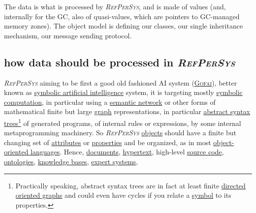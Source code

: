 \documentclass[11pt,a4paper,svgnames]{article}
\newcommand{\RefPerSys}{{\textit{\textsc{RefPerSys}}}}
\begin{document}
The data is what is processed by {\RefPerSys}, and is made of values
(and, internally for the GC, also of quasi-values, which are pointers
to GC-managed memory zones). The object model is defining our classes,
our single inheritance mechanism, our message sending protocol.

\subsection{how data should be processed in \RefPerSys}
\label{subsec:howdata}

{\RefPerSys} aiming to be first a good old fashioned AI system
(\href{http://bootstrappingartificialintelligence.fr/WordPress3/2013/12/the-future-of-ai-is-the-good-old-fashioned-artificial-intelligence/}{\textsc{Gofai}}),
better known as
\href{https://en.wikipedia.org/wiki/Symbolic\_artificial\_intelligence}{symbolic
  artificial intelligence} system, it is targeting mostly
\href{https://en.wikipedia.org/wiki/Computer\_algebra}{symbolic
  computation}, in particular using a
\href{https://en.wikipedia.org/wiki/Semantic\_network}{semantic
  network} or other forms of mathematical finite but large
\href{https://en.wikipedia.org/wiki/Graph\_(discrete\_mathematics)}{graph}
representations, in particular
\href{https://en.wikipedia.org/wiki/Abstract\_syntax\_tree}{abstract
  syntax trees}\footnote{Practically speaking, abstract syntax trees
are in fact at least finite
\href{https://en.wikipedia.org/wiki/Directed_acyclic_graph}{directed
  oriented graphs} and could even have cycles if you relate a
\href{https://en.wikipedia.org/wiki/Symbol\_(programming)}{symbol} to
its properties.} of generated programs, of internal rules or
expressions, by some internal metaprogramming machinery. So
{\RefPerSys}
\href{https://en.wikipedia.org/wiki/Object_(computer_science)}{objects}
should have a finite but changing set of
\href{https://en.wikipedia.org/wiki/Attribute_(computing)}{attributes}
or
\href{https://en.wikipedia.org/wiki/Property_(programming)}{properties}
and be organized, as in most
\href{https://en.wikipedia.org/wiki/Object-oriented_programming}{object-oriented
  languages}. Hence,
\href{https://en.wikipedia.org/wiki/Electronic\_document}{documents},
\href{https://en.wikipedia.org/wiki/Hypertext}{hypertext}, high-level
\href{https://en.wikipedia.org/wiki/Source\_code}{source code},
\href{https://en.wikipedia.org/wiki/Ontology\_(information\_science)}{ontologies},
\href{https://en.wikipedia.org/wiki/Knowledge\_base}{knowledge bases},
\href{https://en.wikipedia.org/wiki/Expert\_system}{expert systems},
\end{document}

